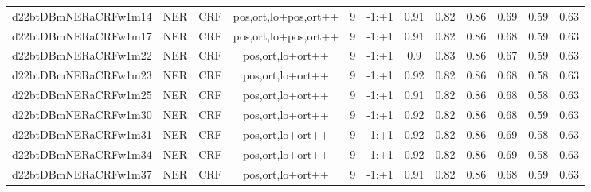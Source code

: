 \documentclass[a4paper]{article}
\begin{document}
\begin{landscape}
\begin{center}
\begin{tabular}{ |c|c|c|c|c|c|c|c|c|c|c|c|}
 	\small{ d22btDBmNERaCRFw1m14 } & \small{ NER} & \small{  CRF }  & pos,ort,lo+pos,ort++  &  9 &  \small{  -1:+1 }  &  0.91 & 0.82 & 0.86  &  0.69 & 0.59 & 0.63 \\
 	

 
 	
 	\small{ d22btDBmNERaCRFw1m17 } & \small{ NER} & \small{  CRF }  & pos,ort,lo+pos,ort++  &  9 &  \small{  -1:+1 }  &  0.91 & 0.82 & 0.86  &  0.68 & 0.59 & 0.63 \\
 	

 
 	
 	\small{ d22btDBmNERaCRFw1m22 } & \small{ NER} & \small{  CRF }  & pos,ort,lo+ort++  &  9 &  \small{  -1:+1 }  &  0.9 & 0.83 & 0.86  &  0.67 & 0.59 & 0.63 \\
 	

 
 	
 	\small{ d22btDBmNERaCRFw1m23 } & \small{ NER} & \small{  CRF }  & pos,ort,lo+ort++  &  9 &  \small{  -1:+1 }  &  0.92 & 0.82 & 0.86  &  0.68 & 0.58 & 0.63 \\
 	

 
 	
 	\small{ d22btDBmNERaCRFw1m25 } & \small{ NER} & \small{  CRF }  & pos,ort,lo+ort++  &  9 &  \small{  -1:+1 }  &  0.91 & 0.82 & 0.86  &  0.68 & 0.58 & 0.63 \\
 	

 
 	
 	\small{ d22btDBmNERaCRFw1m30 } & \small{ NER} & \small{  CRF }  & pos,ort,lo+ort++  &  9 &  \small{  -1:+1 }  &  0.92 & 0.82 & 0.86  &  0.68 & 0.59 & 0.63 \\
 	

 
 	
 	\small{ d22btDBmNERaCRFw1m31 } & \small{ NER} & \small{  CRF }  & pos,ort,lo+ort++  &  9 &  \small{  -1:+1 }  &  0.92 & 0.82 & 0.86  &  0.69 & 0.58 & 0.63 \\
 	

 
 	
 	\small{ d22btDBmNERaCRFw1m34 } & \small{ NER} & \small{  CRF }  & pos,ort,lo+ort++  &  9 &  \small{  -1:+1 }  &  0.92 & 0.82 & 0.86  &  0.69 & 0.58 & 0.63 \\
 	

 
 	
 	\small{ d22btDBmNERaCRFw1m37 } & \small{ NER} & \small{  CRF }  & pos,ort,lo+ort++  &  9 &  \small{  -1:+1 }  &  0.91 & 0.82 & 0.86  &  0.68 & 0.59 & 0.63 \\
 	


\end{tabular}
\end{center}
\end{landscape}
\end{document}
